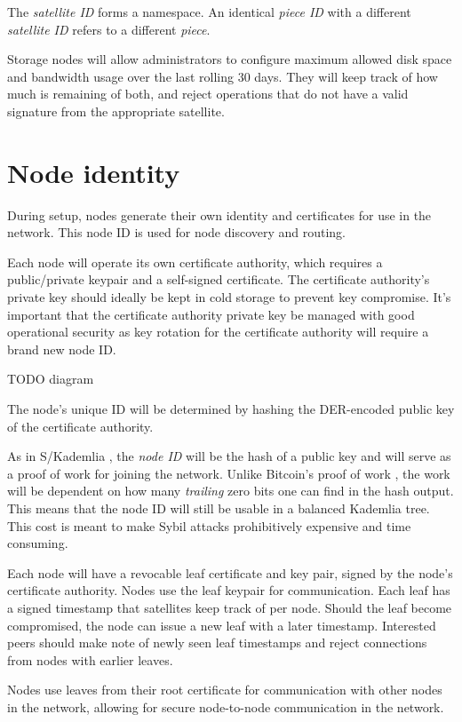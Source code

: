 \documentclass[11pt,fleqn,openany]{book}
\newcommand{\todo}[1]{{\color{red} TODO #1 }}
\begin{document}
The {\em satellite ID} forms a namespace. An identical {\em piece ID} with a
different {\em satellite ID} refers to a different {\em piece}.

Storage nodes will allow administrators to configure maximum allowed disk
space and bandwidth usage over the last rolling 30 days.
They will keep track of how much is remaining of both, and reject operations
that do not have a valid signature from the appropriate satellite.

\section{Node identity}

During setup, nodes generate their own identity and certificates for use in
the network.
This node ID is used for node discovery and routing.

Each node will operate its own certificate authority, which requires a
public/private keypair and a self-signed certificate. The certificate
authority's private key should ideally be kept in cold storage to prevent key
compromise.
It's important that the certificate authority private key be managed with good
operational security as key rotation for the certificate authority will require
a brand new node ID.

\todo{diagram}

The node's unique ID will be determined by hashing the DER-encoded public key
of the certificate authority.

As in S/Kademlia \cite{skad}, the {\em node ID} will be the hash of a public key
and will serve as a proof of work for joining the network. Unlike Bitcoin's
proof of work \cite{bitcoin}, the work will be dependent on how many
{\em trailing}
zero bits one can find in the hash output. This means that the node ID will
still be usable in a balanced Kademlia \cite{kad} tree.
This cost is meant to make Sybil attacks prohibitively expensive and time
consuming.

Each node will have a revocable leaf certificate and key pair, signed by
the node's certificate authority. Nodes use the leaf keypair for
communication. Each leaf has a signed timestamp that satellites
keep track of per node. Should the leaf become compromised, the node can issue
a new leaf with a later timestamp. Interested peers should make note of newly
seen leaf timestamps and reject connections from nodes with earlier leaves.

Nodes use leaves from their root certificate for communication with other
nodes in the network, allowing for secure node-to-node communication in the network.
\end{document}
